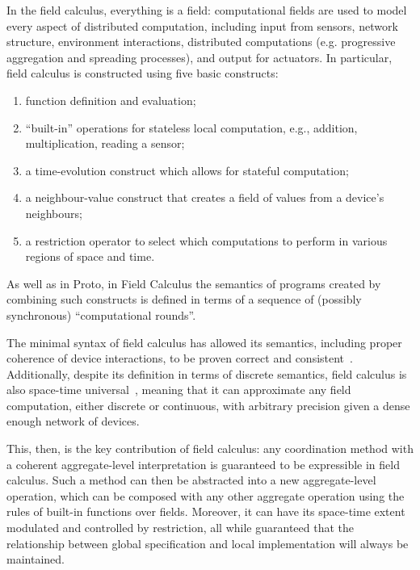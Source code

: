 \documentclass[12pt,a4paper,twoside,openright]{book}
\begin{document}
In the field calculus, everything is a field: computational fields are used to model every aspect of distributed computation, including input from sensors, network structure, environment interactions, distributed computations (e.g. progressive aggregation and spreading processes), and output for actuators.
%
In particular, field calculus is constructed using five basic constructs:
\begin{enumerate}
 \item function definition and evaluation;
 \item ``built-in'' operations for stateless local computation, e.g.,
addition, multiplication, reading a sensor;
 \item a time-evolution construct which allows for stateful computation;
 \item a neighbour-value construct that creates a field of values from a device's neighbours;
 \item a restriction operator to select which computations to perform in various regions of space and time.
\end{enumerate}

As well as in Proto, in Field Calculus the semantics of programs created by combining such constructs is defined in terms of a sequence of (possibly synchronous) ``computational rounds''.

The minimal syntax of field calculus has allowed its semantics, including proper coherence of device interactions, to be proven correct and consistent~\cite{VDB-FOCLASA-CIC2013}.
%
Additionally, despite its definition in terms of discrete semantics, field calculus is also space-time universal~\cite{BVD-SCW14}, meaning that it can approximate any field computation, either discrete or continuous, with arbitrary precision given a dense enough network of devices.

This, then, is the key contribution of field calculus: any coordination method with a coherent aggregate-level interpretation is guaranteed to be expressible in field calculus.
%
Such a method can then be abstracted into a new aggregate-level operation, which can be composed with any other aggregate operation using the rules of built-in functions over fields.
%
Moreover, it can have its space-time extent modulated and controlled by restriction, all while guaranteed that the relationship between global specification and local implementation will always be maintained.
\end{document}
